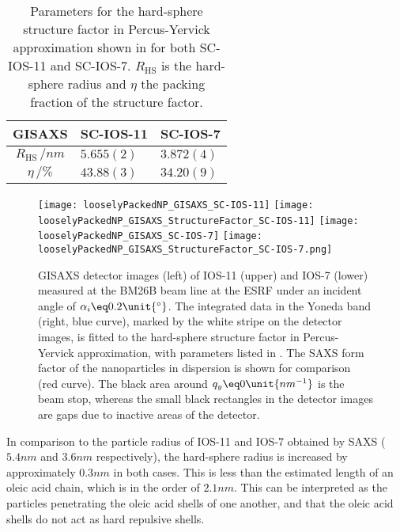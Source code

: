 \documentclass[\main/dresen_thesis.tex]{subfiles}
\begin{document}
  \begin{table}[!htbp]
    \centering
    \caption{\label{tab:looselyPackedNP:nanoparticle:gisaxs}Parameters for the hard-sphere structure factor in Percus-Yervick approximation shown in  for both SC-IOS-11 and SC-IOS-7. $R_\mathrm{HS}$ is the hard-sphere radius and $\eta$ the packing fraction of the structure factor.}
    \begin{tabular}{ c | l | l }
      \rule{0pt}{2ex} \textbf{GISAXS}  & \textbf{SC-IOS-11} & \textbf{SC-IOS-7} \\
      \hline
      \rule{0pt}{2ex} $R_\mathrm{HS} \, / \unit{nm}$          & $5.655(2)$           & $3.872(4)$\\
      \rule{0pt}{2ex} $\eta          \, / \unit{\%}$          & $43.88(3)$           & $34.20(9)$\\
      \hline
    \end{tabular}
  \end{table}
  \begin{figure}[tb]
    \centering
    \texttt{[image: looselyPackedNP\_GISAXS\_SC-IOS-11]}
    \texttt{[image: looselyPackedNP\_GISAXS\_StructureFactor\_SC-IOS-11]}
    \texttt{[image: looselyPackedNP\_GISAXS\_SC-IOS-7]}
    \texttt{[image: looselyPackedNP\_GISAXS\_StructureFactor\_SC-IOS-7.png]}
    \caption{\label{fig:looselyPackedNP:layer:gisaxs}GISAXS detector images (left) of IOS-11 (upper) and IOS-7 (lower) measured at the BM26B beam line at the ESRF under an incident angle of $\alpha_i \eq 0.2 \unit{^\circ}$. The  integrated data in the Yoneda band (right, blue curve), marked by the white stripe on the detector images, is fitted to the hard-sphere structure factor in Percus-Yervick approximation, with parameters listed in . The SAXS form factor of the nanoparticles in dispersion is shown for comparison (red curve). The black area around $q_y \eq 0 \unit{nm^{-1}}$ is the beam stop, whereas the small black rectangles in the detector images are gaps due to inactive areas of the detector. }
  \end{figure}

  In comparison to the particle radius of IOS-11 and IOS-7 obtained by SAXS ($5.4 \unit{nm}$ and $3.6 \unit{nm}$ respectively), the hard-sphere radius is increased by approximately $0.3 \unit{nm}$ in both cases.
  This is less than the estimated length of an oleic acid chain, which is in the order of $2.1 \unit{nm}$.
  This can be interpreted as the particles penetrating the oleic acid shells of one another, and that the oleic acid shells do not act as hard repulsive shells.
\end{document}
